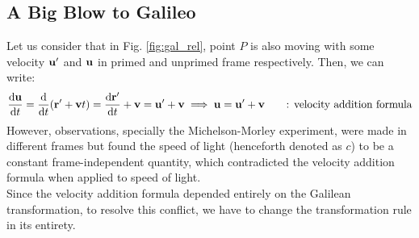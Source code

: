 \subsection{A Big Blow to Galileo }
Let us consider that in Fig. \ref{fig:gal_rel}, point $P$ is also moving with some velocity $\vb{u}'$ and $\vb{u}$ in primed and unprimed frame respectively. Then, we can write:
$$\dv{\vb{u}}{t} = \dv{t} (\vb{r}' + \vb{v}t) = \dv{\vb{r}'}{t} + \vb{v} = \vb{u}'+\vb{v}\implies \vb{u} = \vb{u}'+\vb{v} \qquad \text{: velocity addition formula}$$
However, observations, specially the Michelson-Morley experiment, were made in different frames but found the speed of light (henceforth denoted as $c$) to be a constant frame-independent quantity, which contradicted the velocity addition formula when applied to speed of light. \\[0.2cm]
Since the velocity addition formula depended entirely on the Galilean transformation, to resolve this conflict, we have to change the transformation rule in its entirety.
